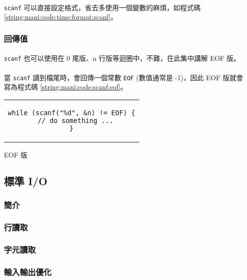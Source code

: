 \documentclass[12pt,a4paper,oneside]{report}
\begin{document}
\begin{CJK}{UTF8}{bkai}
\paragraph{}\lstinline!scanf! 可以直接設定格式，省去多使用一個變數的麻煩，如程式碼 \ref{string:mani:code:time:format:scanf}。

\subsubsection{回傳值}

\paragraph{}\lstinline!scanf! 也可以使用在 0 尾版、n 行版等迴圈中，不難，在此集中講解 EOF 版。
\paragraph{}當 \lstinline!scanf! 讀到檔尾時，會回傳一個常數 \lstinline!EOF! (數值通常是 -1)，因此 EOF 版就會寫為程式碼 \ref{string:mani:code:scanf:eof}。

\begin{code}[h!]
  \centering
  \begin{tabular}{c}
  \begin{lstlisting}
while (scanf("%d", &n) != EOF) {
  // do something ...
}
  \end{lstlisting}
  \end{tabular}
  \caption{EOF 版}
  \label{string:mani:code:scanf:eof}
\end{code}

\subsection{標準 I/O}

\subsubsection{簡介}
\subsubsection{行讀取}
\subsubsection{字元讀取}
\subsubsection{輸入輸出優化}


\end{CJK}
\end{document}
